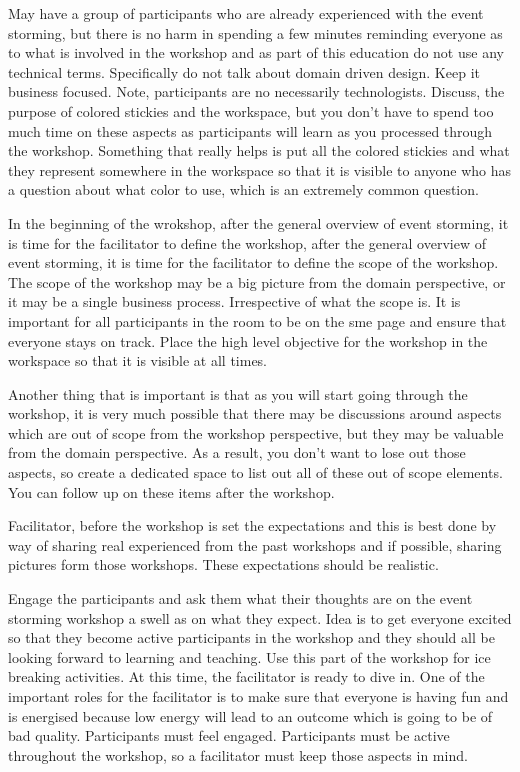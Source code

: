 May have a group of participants who are already experienced with the event storming, but there is no harm in spending a few minutes reminding everyone as to what is involved in the workshop and as part of this education do not use any technical terms.
Specifically do not talk about domain driven design.
Keep it business focused.
Note, participants are no necessarily technologists.
Discuss, the purpose of colored stickies and the workspace, but you don't have to spend too much time on these aspects as participants will learn as you processed through the workshop.
Something that really helps is put all the colored stickies and what they represent somewhere in the workspace so that it is visible to anyone who has a question about what color to use, which is an extremely common question.

In the beginning of the wrokshop, after the general overview of event storming, it is time for the facilitator to define the workshop, after the general overview of event storming, it is time for the facilitator to define the scope of the workshop.
The scope of the workshop may be a big picture from the domain perspective, or it may be a single business process.
Irrespective of what the scope is.
It is important for all participants in the room to be on the sme page and ensure that everyone stays on track.
Place the high level objective for the workshop in the workspace so that it is visible at all times.

Another thing that is important is that as you will start going through the workshop, it is very much possible that there may be discussions around aspects which are out of scope from the workshop perspective, but they may be valuable from the domain perspective.
As a result, you don't want to lose out those aspects, so create a dedicated space to list out all of these out of scope elements.
You can follow up on these items after the workshop.

Facilitator, before the workshop is set the expectations and this is best done by way of sharing real experienced from the past workshops and if possible, sharing pictures form those workshops.
These expectations should be realistic.

Engage the participants and ask them what their thoughts are on the event storming workshop a swell as on what they expect.
Idea is to get everyone excited so that they become active participants in the workshop and they should all be looking forward to learning and teaching.
Use this part of the workshop for ice breaking activities.
At this time, the facilitator is ready to dive in.
One of the important roles for the facilitator is to make sure that everyone is having fun and is energised because low energy will lead to an outcome which is going to be of bad quality.
Participants must feel engaged.
Participants must be active throughout the workshop, so a facilitator must keep those aspects in mind.


